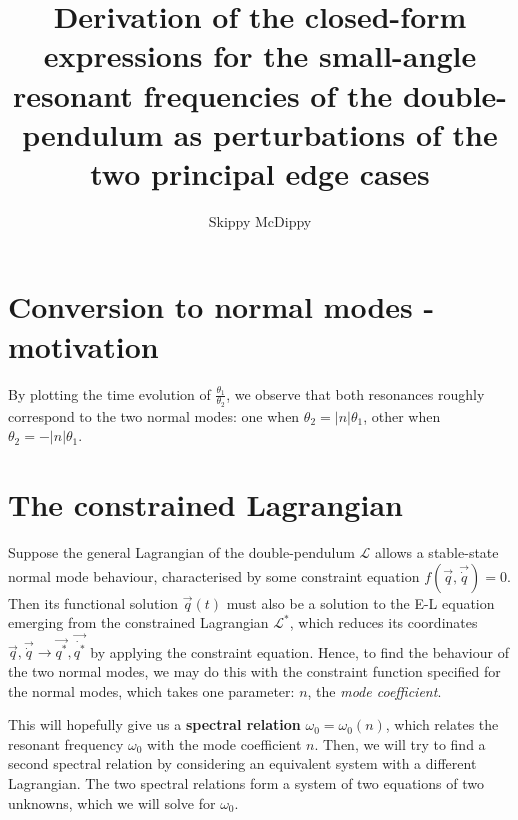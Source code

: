 \documentclass[12pt]{article}
\begin{document}
	\title{Derivation of the closed-form expressions for the small-angle resonant frequencies of the double-pendulum as perturbations of the two principal edge cases}
	\author{Skippy McDippy}
	\maketitle	
	
	\section{Conversion to normal modes - motivation}

	By plotting the time evolution of $\frac{\theta_1}{\theta_2}$, we observe that both resonances roughly correspond to the two normal modes: one when $\theta_2=|n|\theta_1$, other when $\theta_2=-|n|\theta_1$.
	
	\section{The constrained Lagrangian}
	Suppose the general Lagrangian of the double-pendulum $\mathcal{L}$ allows a stable-state normal mode behaviour, characterised by some constraint equation $f(\vec{q},\vec{\dot{q}})=0$. Then its functional solution $\vec{q}(t)$ must also be a solution to the E-L equation emerging from the constrained Lagrangian $\mathcal{L}^*$, which reduces its coordinates $\vec{q},\vec{\dot{q}}\rightarrow\vec{q^*},\vec{\dot{q^*}}$ by applying the constraint equation. Hence, to find the behaviour of the two normal modes, we may do this with the constraint function specified for the normal modes, which takes one parameter: $n$, the \textit{mode coefficient}.
	
	This will hopefully give us a \textbf{spectral relation} $\omega_0=\omega_0(n)$, which relates the resonant frequency $\omega_0$ with the mode coefficient $n$. Then, we will try to find a second spectral relation by considering an equivalent system with a different Lagrangian. The two spectral relations form a system of two equations of two unknowns, which we will solve for $\omega_0$.
	
\end{document}
